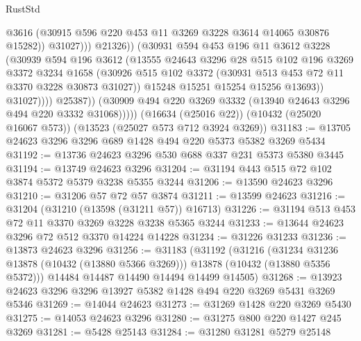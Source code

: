 \begin{lexlean}{RustStd}
\begin{coremodule}
                                @3616
                                (@30915 @596 @220 @453 @11 @3269 @3228 @3614 @14065 @30876 @15282))
                              @31027)))
                        @21326))
                    (@30931
                      @594
                      @453
                      @196
                      @11
                      @3612
                      @3228
                      (@30939
                        @594
                        @196
                        @3612
                        (@13555
                          @24643
                          @3296
                          @28
                          @515
                          @102
                          @196
                          @3269
                          @3372
                          @3234
                          @1658
                          (@30926
                            @515
                            @102
                            @3372
                            (@30931 @513 @453 @72 @11 @3370 @3228 @30873 @31027))
                          @15248
                          @15251
                          @15254
                          @15256
                          @13693))
                      @31027))))
              @25387))
          (@30909 @494 @220 @3269 @3332 (@13940 @24643 @3296 @494 @220 @3332 @31068)))))
    (@16634 (@25016 @22))
    (@10432 (@25020 @16067 @573))
    (@13523 (@25027 @573 @712 @3924 @3269))
@31183 := @13705 @24623 @3296 @3296 @689 @1428 @494 @220 @5373 @5382 @3269 @5434
@31192 := @13736 @24623 @3296 @530 @688 @337 @231 @5373 @5380 @3445
@31194 := @13749 @24623 @3296
@31204 := @31194 @443 @515 @72 @102 @3874 @5372 @5379 @3238 @5355 @3244
@31206 := @13590 @24623 @3296
@31210 := @31206 @57 @72 @57 @3874
@31211 := @13599 @24623
@31216 := @31204 (@31210 (@13598 (@31211 @57)) @16713)
@31226 := @31194 @513 @453 @72 @11 @3370 @3269 @3228 @3238 @5365 @3244
@31233 := @13644 @24623 @3296 @72 @512 @3370 @14224 @14228
@31234 := @31226 @31233
@31236 := @13873 @24623 @3296
@31256 := @31183
    (@31192
      (@31216
        (@31234 @31236 @13878 (@10432 (@13880 @5366 @3269)))
        @13878
        (@10432 (@13880 @5356 @5372)))
      @14484
      @14487
      @14490
      @14494
      @14499
      @14505)
@31268 := @13923 @24623 @3296 @3296 @13927 @5382 @1428 @494 @220 @3269 @5431 @3269 @5346
@31269 := @14044 @24623
@31273 := @31269 @1428 @220 @3269 @5430
@31275 := @14053 @24623 @3296
@31280 := @31275 @800 @220 @1427 @245 @3269
@31281 := @5428 @25143
@31284 := @31280 @31281 @5279 @25148

\end{coremodule}
\end{lexlean}
